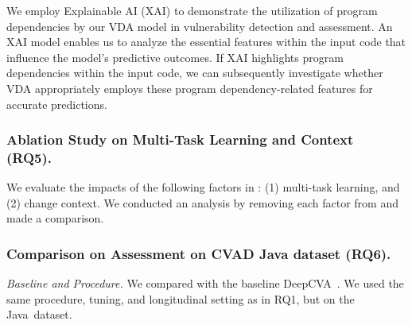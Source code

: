 We employ Explainable AI (XAI) to demonstrate the utilization of
program dependencies by our VDA model in vulnerability detection and
assessment. An XAI model enables us to analyze the essential features
within the input code that influence the model's predictive
outcomes. If XAI highlights program dependencies within the input
code, we can subsequently investigate whether VDA appropriately
employs these program dependency-related features for accurate
predictions.






\subsubsection{Ablation Study on Multi-Task Learning and Context (RQ5).~\\}

We evaluate the impacts of the following factors in {\tool}: (1)
multi-task learning, and (2) change context. We conducted an analysis
by removing each factor from {\tool} and made a comparison.



\subsubsection{Comparison on Assessment on CVAD Java dataset (RQ6).~\\}

{\em Baseline and Procedure.} We compared {\tool} with the baseline
DeepCVA~\cite{deepCVA-ase21}. We used the same procedure, tuning, and
longitudinal setting as in RQ1, but on the Java~dataset.








